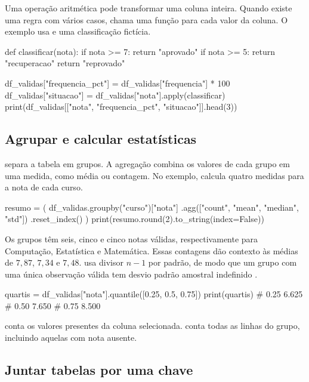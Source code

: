 Uma operação aritmética pode transformar uma coluna inteira. Quando existe uma regra com vários casos,  chama uma função para cada valor da coluna. O exemplo usa  e uma classificação fictícia.

\begin{exemplo}
def classificar(nota):
    if nota >= 7:
        return "aprovado"
    if nota >= 5:
        return "recuperacao"
    return "reprovado"

df_validas["frequencia_pct"] = df_validas["frequencia"] * 100
df_validas["situacao"] = df_validas["nota"].apply(classificar)
print(df_validas[["nota", "frequencia_pct", "situacao"]].head(3))
\end{exemplo}

\subsection{Agrupar e calcular estatísticas}
\label{sec:agrupar}

 separa a tabela em grupos. A agregação combina os valores de cada grupo em uma medida, como média ou contagem. No exemplo,  calcula quatro medidas para a nota de cada curso.

\begin{exemplo}
resumo = (
    df_validas.groupby("curso")["nota"]
    .agg(["count", "mean", "median", "std"])
    .reset_index()
)
print(resumo.round(2).to_string(index=False))
\end{exemplo}

Os grupos têm seis, cinco e cinco notas válidas, respectivamente para Computação, Estatística e Matemática. Essas contagens dão contexto às médias de \(7{,}87\), \(7{,}34\) e \(7{,}48\).  usa divisor \(n-1\) por padrão, de modo que um grupo com uma única observação válida tem desvio padrão amostral indefinido \cite{pandas}.

\begin{exemplo}
quartis = df_validas["nota"].quantile([0.25, 0.5, 0.75])
print(quartis)
# 0.25    6.625
# 0.50    7.650
# 0.75    8.500
\end{exemplo}

 conta os valores presentes da coluna selecionada.  conta todas as linhas do grupo, incluindo aquelas com nota ausente.

\subsection{Juntar tabelas por uma chave}

